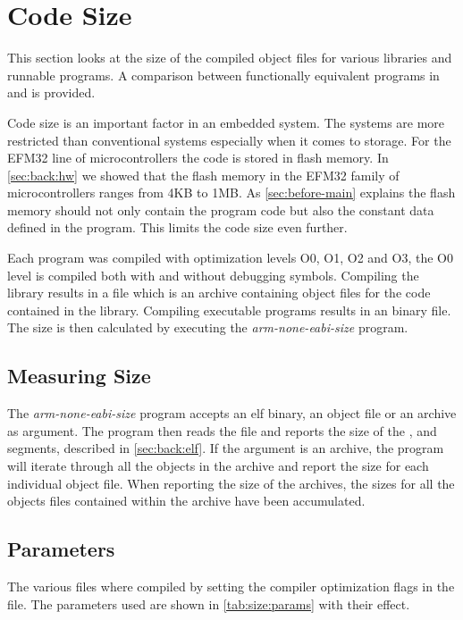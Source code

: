 \section{Code Size}

This section looks at the size of the compiled object files for various {\rust} libraries and runnable programs.
A comparison between functionally equivalent programs in {\C} and {\rust} is provided.

Code size is an important factor in an embedded system.
The systems are more restricted than conventional systems especially when it comes to storage.
For the EFM32 line of microcontrollers the code is stored in flash memory.
In \autoref{sec:back:hw} we showed that the flash memory in the EFM32 family of microcontrollers ranges from 4KB to 1MB.
As \autoref{sec:before-main} explains the flash memory should not only contain the program code but also the constant data defined in the program.
This limits the code size even further.

Each program was compiled with optimization levels O0, O1, O2 and O3, the O0 level is compiled both with and without debugging symbols.
Compiling the library results in a  file which is an archive containing object files for the code contained in the library.
Compiling executable programs results in an {\elf} binary file.
The size is then calculated by executing the \emph{arm-none-eabi-size} program.

\subsection{Measuring Size}
\label{sec:measure-size}

The \emph{arm-none-eabi-size} program accepts an elf binary, an object file or an archive as argument.
The program then reads the file and reports the size of the ,  and  segments, described in \autoref{sec:back:elf}.
If the argument is an archive, the program will iterate through all the objects in the archive and report the size for each individual object file.
When reporting the size of the archives, the sizes for all the objects files contained within the archive have been accumulated.

\subsection{Parameters}
\label{sec:size:params}
The various files where compiled by setting the compiler optimization flags in the  file.
The parameters used are shown in \autoref{tab:size:params} with their effect.

